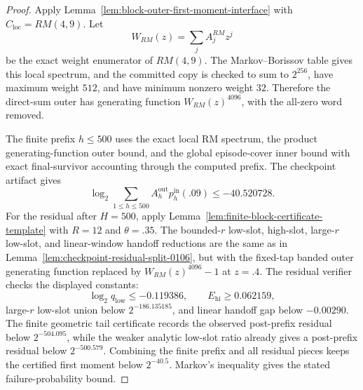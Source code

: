 \begin{proof}
Apply Lemma~\ref{lem:block-outer-first-moment-interface} with \(C_{\mathrm{loc}}=RM(4,9)\).  Let
\[
W_{RM}(z)=\sum_j A_j^{RM}z^j
\]
be the exact weight enumerator of \(RM(4,9)\).  The Markov--Borissov table gives this local spectrum, and the committed
copy is checked to sum to \(2^{256}\), have maximum weight \(512\), and have minimum nonzero weight \(32\).  Therefore
the direct-sum outer has generating function \(W_{RM}(z)^{4096}\), with the all-zero word removed.

The finite prefix \(h\le500\) uses the exact local RM spectrum, the product generating-function outer bound, and the
global episode-cover inner bound with exact final-survivor accounting through the computed prefix.  The checkpoint
artifact gives
\[
\log_2 \sum_{1\le h\le500} A_h^{\mathrm{out}}p_h^{\mathrm{in}}(.09)
\le
-40.520728.
\]
For the residual after \(H=500\), apply Lemma~\ref{lem:finite-block-certificate-template} with \(R=12\) and
\(\theta=.35\).  The bounded-\(r\) low-slot, high-slot, large-\(r\) low-slot, and linear-window handoff reductions are
the same as in Lemma~\ref{lem:checkpoint-residual-split-0106}, but with the fixed-tap banded outer generating function
replaced by \(W_{RM}(z)^{4096}-1\) at \(z=.4\).  The residual verifier checks the displayed constants:
\[
\log_2 q_{\mathrm{low}}\le -0.119386,\qquad
E_{\mathrm{hi}}\ge0.062159,
\]
large-\(r\) low-slot union below \(2^{-186.135185}\), and linear handoff gap below \(-0.00290\).  The finite geometric
tail certificate records the observed post-prefix residual below \(2^{-504.095}\), while the weaker analytic
low-slot ratio already gives a post-prefix residual below \(2^{-500.579}\).  Combining the finite prefix and all residual
pieces keeps the certified first moment below \(2^{-40.5}\).  Markov's inequality gives the stated failure-probability
bound.
\end{proof}

